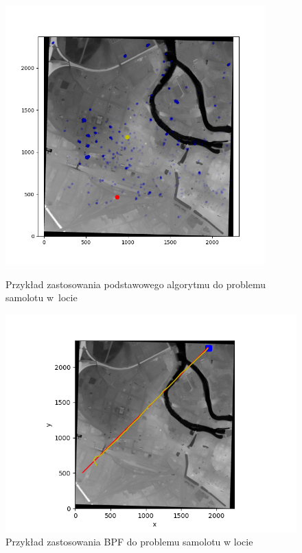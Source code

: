 \begin{figure}[H]
	\begin{center}
		\includegraphics[width=10cm]{./pf_plane.png}
		\caption{Przykład zastosowania podstawowego algorytmu do problemu samolotu w~locie}
		\label{pf_plane}
	\end{center}
	\begin{center}
		\includegraphics[width=14cm]{./bpf_plane_wro.png}
		\caption{Przykład zastosowania BPF do problemu samolotu w locie}
		\label{bpf_plane_wro}
	\end{center}
\end{figure}


